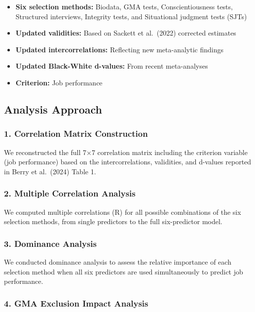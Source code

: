\documentclass[
]{article}
\providecommand{\tightlist}{%
  \setlength{\itemsep}{0pt}\setlength{\parskip}{0pt}}
\begin{document}
\begin{itemize}
\tightlist
\item
  \textbf{Six selection methods:} Biodata, GMA tests, Conscientiousness
  tests, Structured interviews, Integrity tests, and Situational
  judgment tests (SJTs)
\item
  \textbf{Updated validities:} Based on Sackett et al.~(2022) corrected
  estimates
\item
  \textbf{Updated intercorrelations:} Reflecting new meta-analytic
  findings
\item
  \textbf{Updated Black-White d-values:} From recent meta-analyses
\item
  \textbf{Criterion:} Job performance
\end{itemize}

\subsection{Analysis Approach}\label{analysis-approach}

\subsubsection{1. Correlation Matrix
Construction}\label{correlation-matrix-construction}

We reconstructed the full 7×7 correlation matrix including the criterion
variable (job performance) based on the intercorrelations, validities,
and d-values reported in Berry et al.~(2024) Table 1.

\subsubsection{2. Multiple Correlation
Analysis}\label{multiple-correlation-analysis}

We computed multiple correlations (R) for all possible combinations of
the six selection methods, from single predictors to the full
six-predictor model.

\subsubsection{3. Dominance Analysis}\label{dominance-analysis}

We conducted dominance analysis to assess the relative importance of
each selection method when all six predictors are used simultaneously to
predict job performance.

\subsubsection{4. GMA Exclusion Impact
Analysis}\label{gma-exclusion-impact-analysis}
\end{document}
